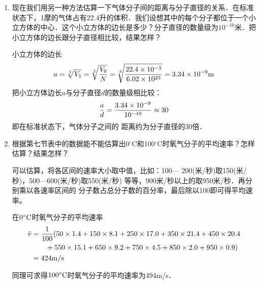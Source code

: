 \begin{enumerate}
	\item 现在我们用另一种方法估算一下气体分子间的距离与分子直径的关系．在标准状态下，1摩的气体占有22.4升的体积．我们设想其中的每个分子都位于一个小立方体的中心．这个小立方体的边长是多少？分子直径的数量级为$10^{-10}$米．把小立方体的边长跟分子直径相比较，结果怎样？

\begin{solution}
    小立方体的边长
\[a=\sqrt[3]{V_1}=\sqrt[3]{\frac{V_0}{N}}=\sqrt[3]{\frac{22.4\times 10^{-3}}{6.02\times 10^{23}}}=3.34\times 10^{-9}{\rm m}\]
把小立方体边长$a$与分子直径$d$的数量级相比较：
\[\frac{a}{d}=\frac{3.34\times 10^{-9}}{10^{-10}}\approx 30\]
即在标准状态下，气体分子之间的
距离约为分子直径的30倍．
\end{solution}
\item 根据第七节表中的数据能不能估算出0$^\circ$C和100$^\circ$C时氧气分子的平均速率？怎样估算？结果怎样？

\begin{solution}
    可以估算，将各区间的速率大小取中值，比如：100—
200(米/秒)取150(米/秒)，500—600(米/秒)取550(米/秒)
等等，900米/秒以上的取950米/秒．再分别乘以各速率区间的
分子数占总分子数的百分率，最后除以100即可得平均速率。

在$0^{\circ}{\rm C}$时氧气分子的平均速率
\[\begin{split}
    \bar v&=\frac{1}{100}(50\times1.4+150\times8.1
+250\times17.0+350\times21.4+450\times20.4\\
&\qquad +550\times15.1+650\times9.2
+750\times4.5+850\times2.0+950\times0.9) \\
&=424{\rm m/s}
\end{split}\]

同理可求得$100^{\circ}{\rm C}$时氧气分子的平均速率为494{\rm m/s}．
\end{solution}
\end{enumerate}



